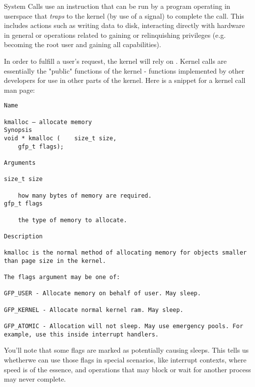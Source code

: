 System Calls use an instruction that can be run by a program operating in userspace that \textit{traps} to the kernel (by use of a signal) to complete the call.
This includes actions such as writing data to disk, interacting directly with hardware in general or operations related to gaining or relinquishing privileges (e.g.  becoming the root user and gaining all capabilities).

In order to fulfill a user's request, the kernel will rely on .
Kernel calls are essentially the "public" functions of the kernel - functions implemented by other developers for use in other parts of the kernel.
Here is a snippet for a kernel call man page:

\begin{lstlisting}
Name

kmalloc — allocate memory
Synopsis
void * kmalloc (	size_t size,
 	gfp_t flags);

Arguments

size_t size

    how many bytes of memory are required.
gfp_t flags

    the type of memory to allocate.

Description

kmalloc is the normal method of allocating memory for objects smaller than page size in the kernel.

The flags argument may be one of:

GFP_USER - Allocate memory on behalf of user. May sleep.

GFP_KERNEL - Allocate normal kernel ram. May sleep.

GFP_ATOMIC - Allocation will not sleep. May use emergency pools. For example, use this inside interrupt handlers.
\end{lstlisting}

You'll note that some flags are marked as potentially causing sleeps.
This tells us whetherwe can use those flags in special scenarios, like interrupt contexts, where speed is of the essence, and operations that may block or wait for another process may never complete.


